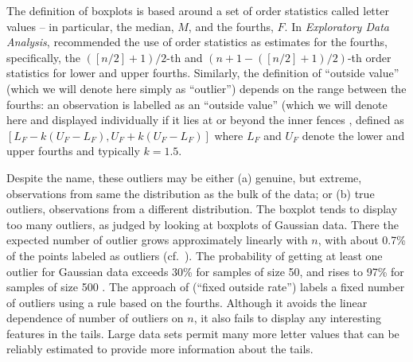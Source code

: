 \documentclass[12pt,oneside]{article}
\begin{document}
The definition of boxplots is based around a set of order statistics called letter values -- in particular, the median, $M$, and the fourths, $F$.  
In \textit{Exploratory Data Analysis}, \citet{eda} recommended the use of order statistics as estimates for the fourths, specifically, the $([n/2] + 1)/2$-th and $(n + 1 - ([n/2] + 1)/2)$-th order statistics for lower and upper fourths. 
Similarly, the definition of ``outside value'' (which we will denote here
simply as ``outlier'') depends on the range between the fourths: 
%
an observation is labelled as an ``outside value'' (which we will denote here
and displayed individually if it lies at or beyond the
inner fences \citep{eda,emerson83}, defined as $[L_F - k(U_F - L_F), U_F +
k(U_F - L_F)]$ where $L_F$ and $U_F$ denote the lower and upper fourths and
typically $k = 1.5$. 

Despite the name, these outliers may be either (a)
genuine, but extreme, observations from same the distribution as the bulk of
the data; or (b) true outliers, observations from a different distribution.
The boxplot tends to display too many outliers, as judged by looking at
boxplots of Gaussian data. There the expected number of outlier grows
approximately linearly with $n$,
with about 0.7\% of the points  labeled as
outliers (cf.~\citet{dchlv}). The probability of getting at
least one outlier for Gaussian data exceeds 30\% for samples of size 50,
and rises to 97\% for samples of size 500 \citep[pg. 1148]{dchbox}. The approach of \citet{dchbi} (``fixed outside rate'')  labels a fixed
number of outliers  using a rule based
on the fourths. 
Although it avoids the linear dependence of
number of outliers on $n$, it also fails to display any interesting
features in the tails.  Large data sets permit many more letter values
that can be reliably estimated to provide more information about the tails.
\end{document}
